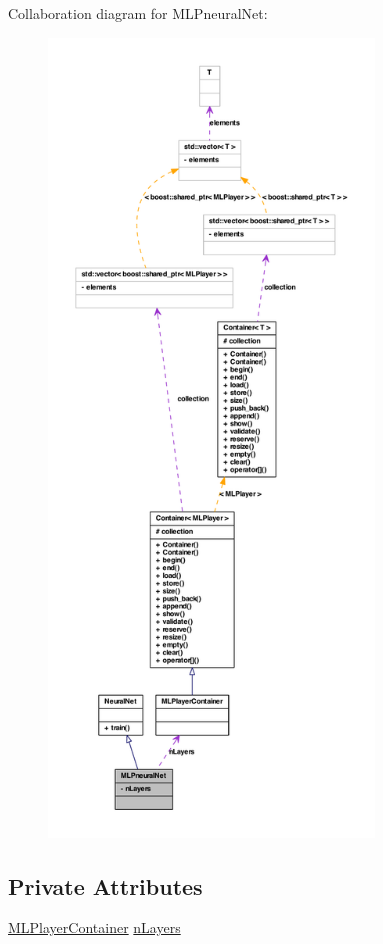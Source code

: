 Collaboration diagram for MLPneuralNet:
\nopagebreak
\begin{figure}[H]
\begin{center}
\leavevmode
\includegraphics[height=600pt]{class_m_l_pneural_net__coll__graph}
\end{center}
\end{figure}
\subsection*{Private Attributes}
\begin{DoxyCompactItemize}
\item 
\hyperlink{class_m_l_player_container}{MLPlayerContainer} \hyperlink{class_m_l_pneural_net_a47ac9b8f98813bf63598c78ad444d6db}{nLayers}
\end{DoxyCompactItemize}


